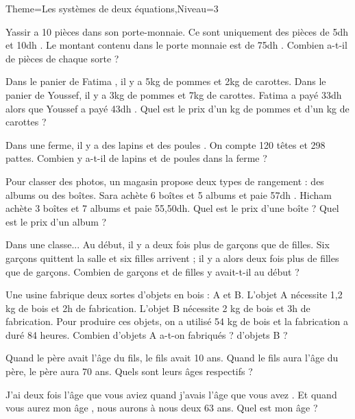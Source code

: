 \documentclass[a4paper,12pt]{article}
\begin{document}
\begin{Maquette}[Fiche]{Theme=Les systèmes de deux équations,Niveau=3}
\begin{exercice}
Yassir a 10 pièces dans son porte-monnaie. Ce sont uniquement des pièces de 5dh et 10dh . Le montant contenu dans le porte monnaie est de 75dh . Combien a-t-il de pièces de chaque sorte ?
\end{exercice}

\begin{exercice}
Dans le panier de Fatima , il y a 5kg de pommes et 2kg de carottes.
Dans le panier de Youssef, il y a 3kg de pommes et 7kg de carottes.
Fatima a payé 33dh alors que Youssef a payé 43dh .
Quel est le prix d’un kg de pommes et d’un kg de carottes ?
\end{exercice}
\begin{exercice}
Dans une ferme, il y a des lapins et des poules . On compte 120 têtes et 298 pattes.
Combien y a-t-il de lapins et de poules dans la ferme ?
\end{exercice}

\begin{exercice}
Pour classer des photos, un magasin propose deux types de rangement : des albums ou des boîtes. Sara achète 6 boîtes et 5 albums et paie 57dh . Hicham achète 3 boîtes et 7 albums et paie 55,50dh.
Quel est le prix d'une boîte ? Quel est le prix d'un album ?
\end{exercice}

\begin{exercice}
Dans une classe... Au début, il y a deux fois plus de garçons que de filles. Six garçons quittent la salle et six filles arrivent ; il y a alors deux fois plus de filles que de garçons.
Combien de garçons et de filles y avait-t-il au début ?
\end{exercice}

\begin{exercice}
Une usine fabrique deux sortes d'objets en bois : A et B.
L'objet A nécessite 1,2 kg de bois et 2h de fabrication. L'objet B nécessite 2 kg de bois et 3h de fabrication.
Pour produire ces objets, on a utilisé 54 kg de bois et la fabrication a duré 84 heures.
Combien d'objets A a-t-on fabriqués ? d'objets B ?
\end{exercice}

\begin{exercice}
Quand le père avait l'âge du fils, le fils avait 10 ans.
Quand le fils aura l'âge du père, le père aura 70 ans.
Quels sont leurs âges respectifs ?
\end{exercice}

\begin{exercice}
J'ai deux fois l'âge que vous aviez quand j'avais l'âge que vous avez .
Et quand vous aurez mon âge , nous aurons à nous deux 63 ans.
Quel est mon âge ?
\end{exercice}


\end{Maquette}
\end{document}
